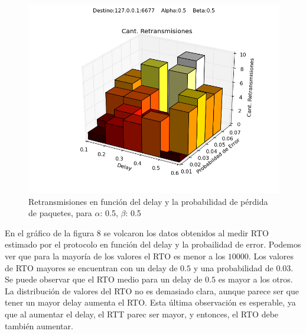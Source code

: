 \begin{figure}[H]
  \centering	
	\includegraphics[scale=0.5]{../analisis/graficos_tablas/graficos_en_funcion_de_delay_probaerror/0.5-0.5/retransmisiones.png}
  \caption{Retransmisiones en funci\'on del delay y la probabilidad de pérdida de paquetes, para $\alpha$: 0.5, $\beta$: 0.5}
	\label{fig:histo-src-sitiotrabajo}
\end{figure}

En el gráfico de la figura $8$ se volcaron los datos obtenidos al medir RTO estimado por el protocolo en función del delay y la probailidad de error. Podemos ver que para la mayoría de los valores el RTO es menor a los $10000$. Los valores de RTO mayores se encuentran con un delay de $0.5$ y una probabilidad de $0.03$. Se puede observar que el RTO medio para un delay de $0.5$ es mayor a los otros. La distribución de valores del RTO no es demasiado clara, aunque parece ser que tener un mayor delay aumenta el RTO. Esta última observación es esperable, ya que al aumentar el delay, el RTT parec ser mayor, y entonces, el RTO debe también aumentar.

